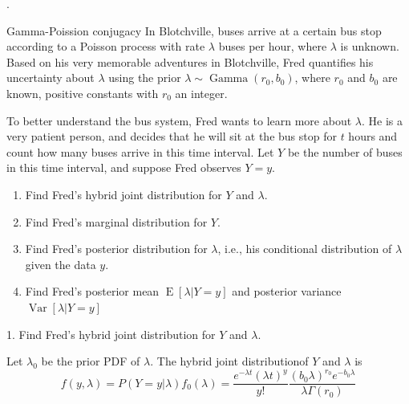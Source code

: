 \documentclass[8pt]{beamer}
\newcommand{\expec}[1]{\operatorname{E}\left[ #1 \right]}
\newcommand{\Var}[1]{\operatorname{Var}\left[#1\right]}
\newcommand{\GammaDist}[2]{\operatorname{Gamma}\!\left(#1, #2\right)}
\begin{document}
\begin{frame}{.}
    \begin{block}{Gamma-Poission conjugacy}
        In Blotchville, buses arrive at a certain bus stop according to a Poisson process with rate $\lambda$ buses per hour, where $\lambda$ is unknown. Based on his very memorable adventures in Blotchville, Fred quantifies his uncertainty about $\lambda$ using the prior $\lambda \sim \GammaDist{r_0}{b_0}$, where $r_0$ and $b_0$ are known, positive constants with $r_0$ an integer.

        To better understand the bus system, Fred wants to learn more about $\lambda$. He is a very patient person, and decides that he will sit at the bus stop for $t$ hours and count how many buses arrive in this time interval. Let $Y$ be the number of buses in this time interval, and suppose Fred observes $Y=y$.

        \begin{enumerate}
            \item Find Fred's hybrid joint distribution for $Y$ and $\lambda$.
            \item Find Fred's marginal distribution for $Y$.
            \item Find Fred's posterior distribution for $\lambda$, i.e., his conditional distribution of $\lambda$ given the data $y$.
            \item Find Fred's posterior mean $\expec{\lambda|Y=y}$ and posterior variance $\Var{\lambda|Y=y}$
        \end{enumerate}

        1. Find Fred's hybrid joint distribution for $Y$ and $\lambda$.

        Let $\lambda_0$ be the prior PDF of $\lambda$. The hybrid joint distributionof $Y$ and $\lambda$ is
        \[
            f(y, \lambda) = P(Y=y|\lambda) f_0(\lambda)= \frac{e^{-\lambda t}(\lambda t)^y}{y!} \frac{(b_0 \lambda)^{r_0} e^{-b_0 \lambda}}{\lambda \Gamma(r_0)}
        \]
    \end{block}
\end{frame}
\end{document}
